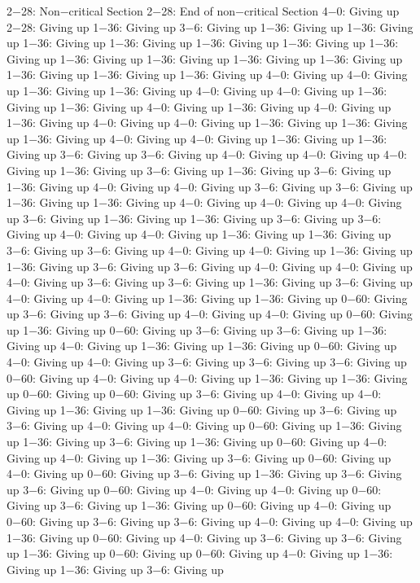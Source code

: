 2−28: Non−critical Section
2−28: End of non−critical Section
4−0: Giving up
2−28: Giving up
1−36: Giving up
3−6: Giving up
1−36: Giving up
1−36: Giving up
1−36: Giving up
1−36: Giving up
1−36: Giving up
1−36: Giving up
1−36: Giving up
1−36: Giving up
1−36: Giving up
1−36: Giving up
1−36: Giving up
1−36: Giving up
1−36: Giving up
1−36: Giving up
4−0: Giving up
4−0: Giving up
1−36: Giving up
1−36: Giving up
4−0: Giving up
4−0: Giving up
1−36: Giving up
1−36: Giving up
4−0: Giving up
1−36: Giving up
4−0: Giving up
1−36: Giving up
4−0: Giving up
4−0: Giving up
1−36: Giving up
1−36: Giving up
1−36: Giving up
4−0: Giving up
4−0: Giving up
1−36: Giving up
1−36: Giving up
3−6: Giving up
3−6: Giving up
4−0: Giving up
4−0: Giving up
4−0: Giving up
1−36: Giving up
3−6: Giving up
1−36: Giving up
3−6: Giving up
1−36: Giving up
4−0: Giving up
4−0: Giving up
3−6: Giving up
3−6: Giving up
1−36: Giving up
1−36: Giving up
4−0: Giving up
4−0: Giving up
4−0: Giving up
3−6: Giving up
1−36: Giving up
1−36: Giving up
3−6: Giving up
3−6: Giving up
4−0: Giving up
4−0: Giving up
1−36: Giving up
1−36: Giving up
3−6: Giving up
3−6: Giving up
4−0: Giving up
4−0: Giving up
1−36: Giving up
1−36: Giving up
3−6: Giving up
3−6: Giving up
4−0: Giving up
4−0: Giving up
4−0: Giving up
3−6: Giving up
3−6: Giving up
1−36: Giving up
3−6: Giving up
4−0: Giving up
4−0: Giving up
1−36: Giving up
1−36: Giving up
0−60: Giving up
3−6: Giving up
3−6: Giving up
4−0: Giving up
4−0: Giving up
0−60: Giving up
1−36: Giving up
0−60: Giving up
3−6: Giving up
3−6: Giving up
1−36: Giving up
4−0: Giving up
1−36: Giving up
1−36: Giving up
0−60: Giving up
4−0: Giving up
4−0: Giving up
3−6: Giving up
3−6: Giving up
3−6: Giving up
0−60: Giving up
4−0: Giving up
4−0: Giving up
1−36: Giving up
1−36: Giving up
0−60: Giving up
0−60: Giving up
3−6: Giving up
4−0: Giving up
4−0: Giving up
1−36: Giving up
1−36: Giving up
0−60: Giving up
3−6: Giving up
3−6: Giving up
4−0: Giving up
4−0: Giving up
0−60: Giving up
1−36: Giving up
1−36: Giving up
3−6: Giving up
1−36: Giving up
0−60: Giving up
4−0: Giving up
4−0: Giving up
1−36: Giving up
3−6: Giving up
0−60: Giving up
4−0: Giving up
0−60: Giving up
3−6: Giving up
1−36: Giving up
3−6: Giving up
3−6: Giving up
0−60: Giving up
4−0: Giving up
4−0: Giving up
0−60: Giving up
3−6: Giving up
1−36: Giving up
0−60: Giving up
4−0: Giving up
0−60: Giving up
3−6: Giving up
3−6: Giving up
4−0: Giving up
4−0: Giving up
1−36: Giving up
0−60: Giving up
4−0: Giving up
3−6: Giving up
3−6: Giving up
1−36: Giving up
0−60: Giving up
0−60: Giving up
4−0: Giving up
1−36: Giving up
1−36: Giving up
3−6: Giving up
